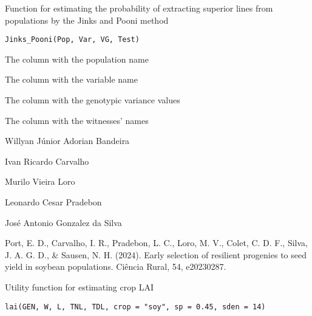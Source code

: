 \documentclass[a4paper]{book}
\begin{document}
%
\begin{Description}
Function for estimating the probability of extracting superior lines from
populations by the Jinks and Pooni method
\end{Description}
%
\begin{Usage}
\begin{verbatim}
Jinks_Pooni(Pop, Var, VG, Test)
\end{verbatim}
\end{Usage}
%
\begin{Arguments}
\begin{ldescription}
\item[\code{Pop}] The column with the population name

\item[\code{Var}] The column with the variable name

\item[\code{VG}] The column with the genotypic variance values

\item[\code{Test}] The column with the witnesses' names
\end{ldescription}
\end{Arguments}
%
\begin{Author}
Willyan Júnior Adorian Bandeira

Ivan Ricardo Carvalho

Murilo Vieira Loro

Leonardo Cesar Pradebon

José Antonio Gonzalez da Silva
\end{Author}
%
\begin{References}
Port, E. D., Carvalho, I. R., Pradebon, L. C., Loro, M. V., Colet, C. D. F.,
Silva, J. A. G. D., \& Sausen, N. H. (2024).
Early selection of resilient progenies to seed yield in soybean populations.
Ciência Rural, 54, e20230287.
\end{References}
%
\begin{Description}
Utility function for estimating crop LAI
\end{Description}
%
\begin{Usage}
\begin{verbatim}
lai(GEN, W, L, TNL, TDL, crop = "soy", sp = 0.45, sden = 14)
\end{verbatim}
\end{Usage}
%
\end{document}
